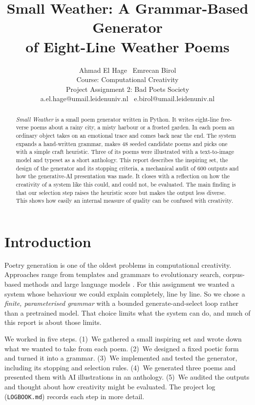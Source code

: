 \documentclass[letterpaper]{article}
\title{Small Weather: A Grammar-Based Generator\\of Eight-Line Weather Poems}
\author{Ahmad El Hage \textbullet\ Emrecan Birol\\
Course: Computational Creativity\\
Project Assignment 2: Bad Poets Society\\
a.el.hage@umail.leidenuniv.nl \textbullet\ e.birol@umail.leidenuniv.nl}
\newcommand{\code}[1]{\texttt{\small #1}}
\begin{document}
\maketitle

\begin{abstract}
\emph{Small Weather} is a small poem generator written in Python. It
writes eight-line free-verse poems about a rainy city, a misty harbour
or a frosted garden. In each poem an ordinary object takes on an
emotional trace and comes back near the end. The system expands a
hand-written grammar, makes 48 seeded candidate poems and picks one
with a simple craft heuristic. Three of its poems were illustrated with
a text-to-image model and typeset as a short anthology. This report
describes the inspiring set, the design of the generator and its
stopping criteria, a mechanical audit of 600 outputs and how the
generative-AI presentation was made. It closes with a reflection on how
the creativity of a system like this could, and could not, be
evaluated. The main finding is that our selection step raises the
heuristic score but makes the output less diverse. This shows how
easily an internal measure of quality can be confused with creativity.
\end{abstract}

\section{Introduction}
Poetry generation is one of the oldest problems in computational
creativity. Approaches range from templates and grammars to evolutionary
search, corpus-based methods and large language models
\citep{lamb2017taxonomy}. For this assignment we wanted a system whose
behaviour we could explain completely, line by line. So we chose a
\emph{finite, parameterised grammar} with a bounded generate-and-select
loop rather than a pretrained model. That choice limits what the system
can do, and much of this report is about those limits.

We worked in five steps. (1)~We gathered a small inspiring set and wrote
down what we wanted to take from each poem. (2)~We designed a fixed
poetic form and turned it into a grammar. (3)~We implemented and tested
the generator, including its stopping and selection rules. (4)~We
generated three poems and presented them with AI illustrations in an
anthology. (5)~We audited the outputs and thought about how
creativity might be evaluated. The project log (\code{LOGBOOK.md})
records each step in more detail.
\end{document}
